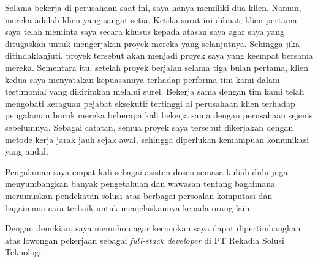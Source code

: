 \documentclass[11pt, a4paper]{awesome-cv} %
\begin{document}
\begin{cvletter}
Selama bekerja di perusahaan saat ini, saya hanya memiliki dua klien. Namun, mereka adalah klien yang sangat setia. Ketika surat ini dibuat, klien pertama saya telah meminta saya secara khusus kepada atasan saya agar saya yang ditugaskan untuk mengerjakan proyek mereka yang selanjutnya. Sehingga jika ditindaklanjuti, proyek tersebut akan menjadi proyek saya yang keempat bersama mereka. Sementara itu, setelah proyek berjalan selama tiga bulan pertama, klien kedua saya menyatakan kepuasannya terhadap performa tim kami dalam testimonial yang dikirimkan melalui surel. Bekerja sama dengan tim kami telah mengobati keraguan pejabat eksekutif tertinggi di perusahaan klien terhadap pengalaman buruk mereka beberapa kali bekerja sama dengan perusahaan sejenis sebelumnya. Sebagai catatan, semua proyek saya tersebut dikerjakan dengan metode kerja jarak jauh sejak awal, sehingga diperlukan kemampuan komunikasi yang andal.

Pengalaman saya empat kali sebagai asisten dosen semasa kuliah dulu juga menyumbangkan banyak pengetahuan dan wawasan tentang bagaimana merumuskan pendekatan solusi atas berbagai persoalan komputasi dan bagaimana cara terbaik untuk menjelaskannya kepada orang lain.

Dengan demikian, saya memohon agar kecocokan saya dapat dipertimbangkan atas lowongan pekerjaan sebagai \textit{full-stack developer} di PT Rekadia Solusi Teknologi.


\end{cvletter}


\makeletterclosing %
\end{document}
